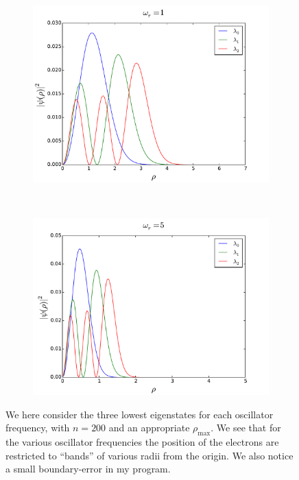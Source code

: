 \documentclass[a4paper, 10pt]{amsart}
\begin{document}
\begin{figure}[h!]
\begin{subfigure}{0.5\textwidth}
    \includegraphics[width=\textwidth]{./plots/schrodinger_200_7_1.pdf}
  \end{subfigure}
  ~
  \begin{subfigure}{0.5\textwidth}
    \includegraphics[width=\textwidth]{./plots/schrodinger_200_5_5.pdf}
  \end{subfigure}
  \caption{We here consider the three lowest eigenstates for each oscillator
    frequency, with $n=200$ and an appropriate $\rho_{\textrm{max}}$. We see
    that for the various oscillator frequencies the position of the electrons
    are restricted to ``bands'' of various radii from the origin. We also notice
    a small boundary-error in my program.}
  \label{fig:varying_frecquency}
\end{figure}
\end{document}
